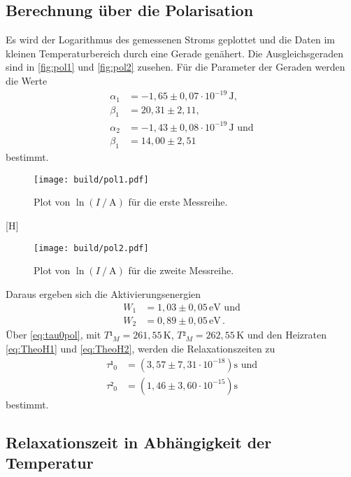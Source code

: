 \subsection{Berechnung über die Polarisation}
\label{sec:BerechnungPolarisation}

Es wird der Logarithmus des gemessenen Stroms geplottet und die Daten im kleinen Temperaturbereich durch eine Gerade genähert.
Die Ausgleichsgeraden sind in \autoref{fig:pol1} und \autoref{fig:pol2} zusehen.
Für die Parameter der Geraden werden die Werte 
\begin{align*}
    \alpha_1 &=   -1,65 \pm 0,07  \cdot 10^{-19} \, \unit{\joule} , \\
    \beta_1  &=   20,31 \pm 2,11                              , \\
    \alpha_2 &=   -1,43 \pm 0,08  \cdot 10^{-19} \, \unit{\joule} \, \,\text{und} \\
    \beta_1  &=   14,00 \pm 2,51
\end{align*}
bestimmt.


\begin{figure}[H]
    \centering
    \texttt{[image: build/pol1.pdf]}
    \caption{Plot von $\ln(I\mathbin{/} \unit{\ampere}) $ für die erste Messreihe.}
    \label{fig:pol1}
\end{figure}[H]
\begin{figure}
    \centering
    \texttt{[image: build/pol2.pdf]}
    \caption{Plot von $\ln(I\mathbin{/} \unit{\ampere}) $ für die zweite Messreihe.}
    \label{fig:pol2}
\end{figure}

Daraus ergeben sich die Aktivierungsenergien 
\begin{align*}
    W_1 &= 1,03 \pm 0,05 \, \unit{\electronvolt}  \, \,  \text{und} \\
    W_2 &= 0,89 \pm 0,05 \, \unit{\electronvolt}    \,.
\end{align*}
Über \eqref{eq:tau0pol}, mit $T¹_M = 261,55 \, \unit{\kelvin}$, $T²_M = 262,55\, \unit{\kelvin}$ 
und den Heizraten \eqref{eq:TheoH1} und \eqref{eq:TheoH2}, werden die Relaxationszeiten zu 
\begin{align*}
    \tau¹_0 &= \left( 3,57 \pm 7,31 \cdot 10^{-18} \right) \unit{\second} \, \, \text{und}  \\
    \tau²_0 &= \left( 1,46 \pm 3,60 \cdot 10^{-15} \right) \unit{\second}   
\end{align*}
bestimmt.

\subsection{Relaxationszeit in Abhängigkeit der Temperatur}

